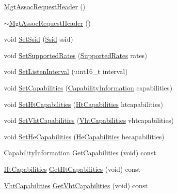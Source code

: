 \begin{DoxyCompactItemize}
\item 
\hyperlink{classns3_1_1MgtAssocRequestHeader_a70a1c08264ee4cc7ed93e261307a8ea5}{Mgt\+Assoc\+Request\+Header} ()
\item 
\hyperlink{classns3_1_1MgtAssocRequestHeader_ab1e25adc48ad9dfe475fd3642667cab6}{$\sim$\+Mgt\+Assoc\+Request\+Header} ()
\item 
void \hyperlink{classns3_1_1MgtAssocRequestHeader_a80438a5c46683abb3ba58264b83bcb84}{Set\+Ssid} (\hyperlink{classns3_1_1Ssid}{Ssid} ssid)
\item 
void \hyperlink{classns3_1_1MgtAssocRequestHeader_a21544f8fe47499b5ffa5c23b780a4a15}{Set\+Supported\+Rates} (\hyperlink{classns3_1_1SupportedRates}{Supported\+Rates} rates)
\item 
void \hyperlink{classns3_1_1MgtAssocRequestHeader_a8720f57ef6469e81c3835565ee68c298}{Set\+Listen\+Interval} (uint16\+\_\+t interval)
\item 
void \hyperlink{classns3_1_1MgtAssocRequestHeader_ab3534737c8397ce42b0cca1680e50321}{Set\+Capabilities} (\hyperlink{classns3_1_1CapabilityInformation}{Capability\+Information} capabilities)
\item 
void \hyperlink{classns3_1_1MgtAssocRequestHeader_a034b985a244db795d06f1b034489d5fd}{Set\+Ht\+Capabilities} (\hyperlink{classns3_1_1HtCapabilities}{Ht\+Capabilities} htcapabilities)
\item 
void \hyperlink{classns3_1_1MgtAssocRequestHeader_a406f5da84d19006e6a60c28d17f1f7df}{Set\+Vht\+Capabilities} (\hyperlink{classns3_1_1VhtCapabilities}{Vht\+Capabilities} vhtcapabilities)
\item 
void \hyperlink{classns3_1_1MgtAssocRequestHeader_a72f7179a6da9c0a8a000f93106309226}{Set\+He\+Capabilities} (\hyperlink{classns3_1_1HeCapabilities}{He\+Capabilities} hecapabilities)
\item 
\hyperlink{classns3_1_1CapabilityInformation}{Capability\+Information} \hyperlink{classns3_1_1MgtAssocRequestHeader_a2ad6fc1992e3d05ff938c3ae2e575716}{Get\+Capabilities} (void) const 
\item 
\hyperlink{classns3_1_1HtCapabilities}{Ht\+Capabilities} \hyperlink{classns3_1_1MgtAssocRequestHeader_a56c4156b105feba38ed3c9737f7a5aad}{Get\+Ht\+Capabilities} (void) const 
\item 
\hyperlink{classns3_1_1VhtCapabilities}{Vht\+Capabilities} \hyperlink{classns3_1_1MgtAssocRequestHeader_a4f1fa89af88b1c6da35928be2f96ce47}{Get\+Vht\+Capabilities} (void) const 
\item 

\end{DoxyCompactItemize}
